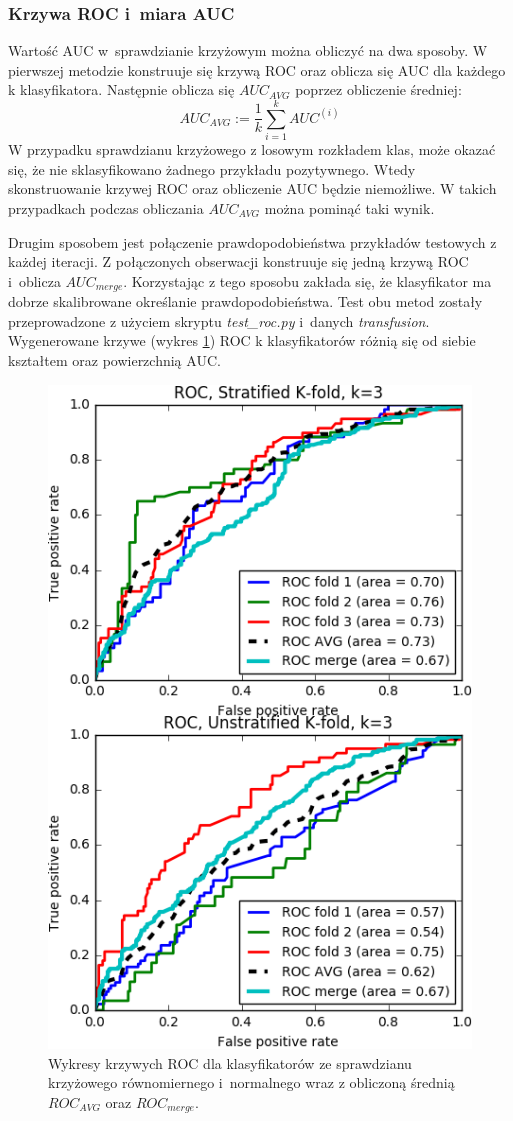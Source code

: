 \subsubsection{Krzywa ROC i~miara AUC}
Wartość AUC w~sprawdzianie krzyżowym można obliczyć na dwa sposoby. W pierwszej metodzie konstruuje się krzywą ROC oraz oblicza się AUC dla każdego k klasyfikatora. Następnie oblicza się $AUC_{AVG}$ poprzez obliczenie średniej:
\[AUC_{AVG} := \frac{1}{k} \sum_{i=1}^{k} AUC^{(i)} \]
W przypadku sprawdzianu krzyżowego z losowym rozkładem klas, może okazać się, że nie sklasyfikowano żadnego przykładu pozytywnego. Wtedy skonstruowanie krzywej ROC oraz obliczenie AUC będzie niemożliwe. W takich przypadkach podczas obliczania $AUC_{AVG}$ można pominąć taki wynik. \par
Drugim sposobem jest połączenie prawdopodobieństwa przykładów testowych z każdej iteracji. Z połączonych obserwacji konstruuje się jedną krzywą ROC i~oblicza $AUC_{merge}$. Korzystając z tego sposobu zakłada się, że klasyfikator ma dobrze skalibrowane określanie prawdopodobieństwa.  Test obu metod zostały przeprowadzone z użyciem skryptu \textit{test\_roc.py} i~danych \textit{transfusion}. Wygenerowane krzywe (wykres \ref{fig:cv_roc}) ROC k klasyfikatorów różnią się od siebie kształtem oraz powierzchnią AUC. 
\begin{figure}[H]
	\centering
	\includegraphics{./images/CV_ROC.png}
	\caption[Wykres krzywej ROC dla różnego sprawdzianu krzyżowego]{Wykresy krzywych ROC dla klasyfikatorów ze sprawdzianu krzyżowego równomiernego i~normalnego wraz z obliczoną średnią $ROC_{AVG}$ oraz $ROC_{merge}$.}
	\label{fig:cv_roc}
\end{figure}
